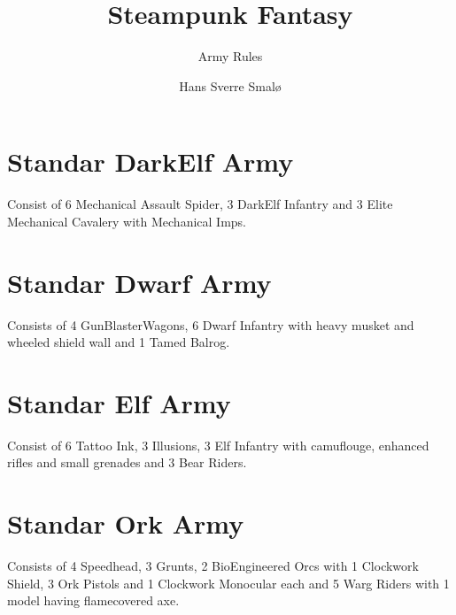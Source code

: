 
\hypersetup{
    colorlinks=true, %
    linktoc=all,     %
    linkcolor=blue,  %
}





\title{Steampunk Fantasy}
\subtitle{Army Rules}
\author{Hans Sverre Smal\o}


\maketitle
\tableofcontents

\chapter{Standar DarkElf Army}

Consist of 6 Mechanical Assault Spider, 3 DarkElf Infantry and 3 Elite Mechanical Cavalery with Mechanical Imps. \\



\chapter{Standar Dwarf Army}

Consists of 4 GunBlasterWagons, 6 Dwarf Infantry with heavy musket and wheeled shield wall and 1 Tamed Balrog.\\



\chapter{Standar Elf Army}

Consist of 6 Tattoo Ink, 3 Illusions, 3 Elf Infantry with camuflouge, enhanced rifles and small grenades and 3 Bear Riders.



\chapter{Standar Ork Army}

Consists of 4 Speedhead, 3 Grunts, 2 BioEngineered Orcs with 1 Clockwork Shield, 3 Ork Pistols and 1 Clockwork Monocular each and 5 Warg Riders with 1 model having flamecovered axe.




